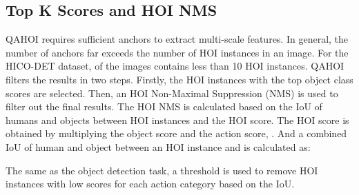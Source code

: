 \documentclass[10pt,twocolumn,letterpaper]{article}
\begin{document}
\subsection{Top K Scores and HOI NMS}
QAHOI requires sufficient anchors to extract multi-scale features. 
In general, the number of anchors far exceeds the number of HOI instances in an image. For the HICO-DET dataset,  of the images contains less than 10 HOI instances. 
QAHOI filters the results in two steps. Firstly, the HOI instances with the top  object class scores are selected. 
Then, an HOI Non-Maximal Suppression (NMS) is used to filter out the final results. The HOI NMS is calculated based on the IoU of humans and objects between HOI instances and the HOI score.
The HOI score is obtained by multiplying the object score and the action score, .
And a combined IoU of human and object between an HOI instance  and  is calculated as:

The same as the object detection task, a threshold  is used to remove HOI instances with low scores for each action category based on the IoU.
\end{document}
